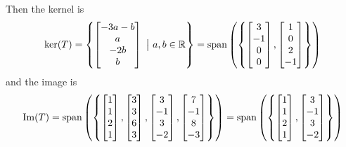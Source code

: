 \begin{solution}
Then the kernel is
$$\ker(T) = \left\{ \begin{bmatrix} -3a-b \\ a \\ -2b \\ b \end{bmatrix}\ \big|\ a,b \in \mathbb{R}\right\} = {\rm span}\left(\left\{ \begin{bmatrix} 3 \\ -1 \\ 0 \\ 0 \end{bmatrix} , \begin{bmatrix} 1\\0 \\ 2 \\ -1 \end{bmatrix} \right\} \right)$$
and the image is 
$${\rm Im}(T) = {\rm span} \left( \left\{ \begin{bmatrix} 1 \\ 1 \\ 2 \\ 1 \end{bmatrix} , \begin{bmatrix} 3 \\ 3 \\ 6 \\ 3 \end{bmatrix}, \begin{bmatrix} 3 \\ -1 \\ 3 \\ -2 \end{bmatrix}, \begin{bmatrix} 7 \\ -1 \\ 8 \\ -3 \end{bmatrix} \right\} \right) = {\rm span} \left( \left\{ \begin{bmatrix} 1 \\ 1 \\ 2 \\ 1 \end{bmatrix} , \begin{bmatrix} 3 \\ -1 \\ 3 \\ -2 \end{bmatrix}\right\} \right)$$
\end{solution}

